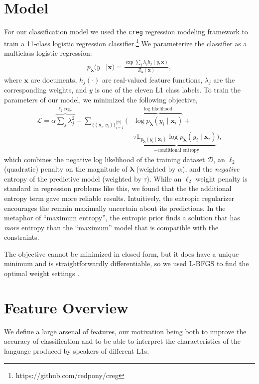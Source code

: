 \documentclass[11pt,letterpaper]{article}
\begin{document}
\section{Model}
\label{sec:model}
For our classification model we used the \texttt{creg} regression modeling framework to train a 11-class logistic regression classifier.\footnote{https://github.com/redpony/creg}  We parameterize the classifier as a multiclass logistic regression:
\begin{align*}
p_{\boldsymbol{\lambda}}(y& \mid \textbf{x})= \frac{\exp \sum_j \lambda_j h_j(y, \textbf{x})}{Z_{\boldsymbol{\lambda}}(\textbf{x})} ,
\end{align*}
where $\textbf{x}$ are documents, $h_j(\cdot)$ are real-valued feature functions, $\lambda_j$ are the corresponding weights, and $y$ is one of the eleven L1 class labels. To train the parameters of our model, we minimized the following objective,
\begin{align*}
\mathcal{L} = \alpha \overbrace{\sum_j \lambda_j^2}^{\textrm{$\ell_2$ reg.}} - \sum_{\{(\textbf{x}_i,y_i )\}_{i=1}^{|\mathcal{D}|}} \Big(& \overbrace{\log p_{\boldsymbol{\lambda}}(y_i \mid \textbf{x}_i)}^{\textrm{log likelihood}}  + \\
& \tau \underbrace{\mathbb{E}_{p_{\boldsymbol{\lambda}}(y_i \mid \textbf{x}_i)} \log p_{\boldsymbol{\lambda}}(y_i \mid \textbf{x}_i)}_{-\textrm{conditional entropy}}\Big) ,
\end{align*}
which combines the negative log likelihood of the training dataset $\mathcal{D}$, an $\ell_2$ (quadratic) penalty on the magnitude of $\boldsymbol{\lambda}$ (weighted by $\alpha$), and the \emph{negative} entropy of the predictive model (weighted by $\tau$). While an $\ell_2$ weight penalty is standard in regression problems like this, we found that the the additional entropy term gave more reliable results. Intuitively, the entropic regularizer encourages the remain maximally uncertain about its predictions. In the metaphor of ``maximum entropy'', the entropic prior finds a solution that has \emph{more} entropy than the ``maximum'' model that is compatible with the constraints.

The objective cannot be minimized in closed form, but it does have a unique minimum and is straightforwardly differentiable, so we used L-BFGS to find the optimal weight settings \citep{lbfgs}.

\section{Feature Overview}
\label{sec:features}
We define a large arsenal of features, our motivation being both to
improve the accuracy of classification and to be able to interpret the
characteristics of the language produced by speakers of different
L1s.
\end{document}
